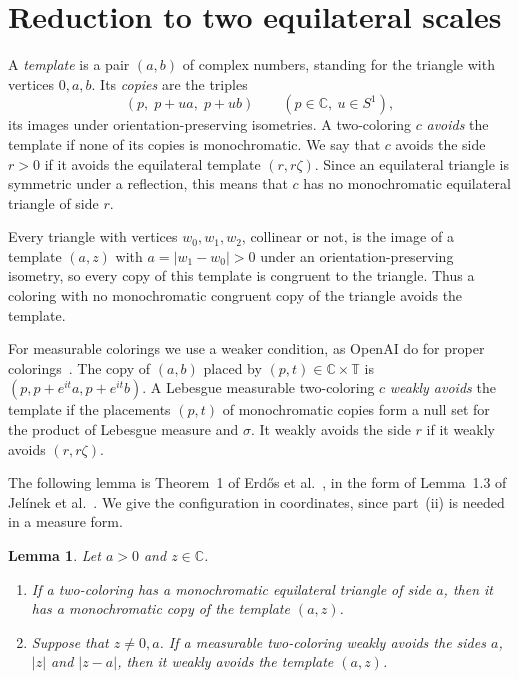 \documentclass[10pt]{article}
\newtheorem{lem}[thm]{Lemma}
\theoremstyle{remark}
\newcommand{\C}{\mathbb C}
\newcommand{\T}{\mathbb T}
\begin{document}
\section{Reduction to two equilateral scales}\label{sec:reduction}

A \emph{template} is a pair $(a,b)$ of complex numbers, standing for the triangle with vertices $0,a,b$. Its \emph{copies} are the triples
\[
 (p,\;p+ua,\;p+ub)\qquad(p\in\C,\ u\in S^1),
\]
its images under orientation-preserving isometries. A two-coloring $c$ \emph{avoids} the template if none of its copies is monochromatic. We say that $c$ avoids the side $r>0$ if it avoids the equilateral template $(r,r\zeta)$. Since an equilateral triangle is symmetric under a reflection, this means that $c$ has no monochromatic equilateral triangle of side $r$.

Every triangle with vertices $w_0,w_1,w_2$, collinear or not, is the image of a template $(a,z)$ with $a=|w_1-w_0|>0$ under an orientation-preserving isometry, so every copy of this template is congruent to the triangle. Thus a coloring with no monochromatic congruent copy of the triangle avoids the template.

For measurable colorings we use a weaker condition, as OpenAI do for proper colorings~\cite[Definition~1.2]{OAI}. The copy of $(a,b)$ placed by $(p,t)\in\C\times\T$ is $(p,p+e^{it}a,p+e^{it}b)$. A Lebesgue measurable two-coloring $c$ \emph{weakly avoids} the template if the placements $(p,t)$ of monochromatic copies form a null set for the product of Lebesgue measure and $\sigma$. It weakly avoids the side $r$ if it weakly avoids $(r,r\zeta)$.

The following lemma is Theorem~1 of Erd\H{o}s et al.~\cite[p.~563]{EGMRSS}, in the form of Lemma~1.3 of Jel\'inek et al.~\cite{JKSV}. We give the configuration in coordinates, since part~(ii) is needed in a measure form.

\begin{lem}\label{lem:eightpoint}
Let $a>0$ and $z\in\C$.
\begin{enumerate}
\item[(i)] If a two-coloring has a monochromatic equilateral triangle of side $a$, then it has a monochromatic copy of the template $(a,z)$.
\item[(ii)] Suppose that $z\ne0,a$. If a measurable two-coloring weakly avoids the sides $a$, $|z|$ and $|z-a|$, then it weakly avoids the template $(a,z)$.
\end{enumerate}
\end{lem}
\end{document}
